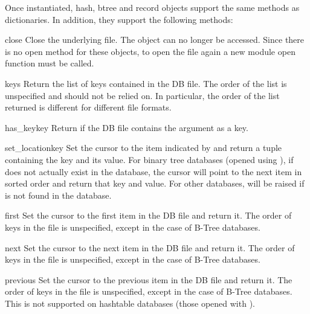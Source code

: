 Once instantiated, hash, btree and record objects support
the same methods as dictionaries.  In addition, they support
the following methods:

\begin{methoddesc}{close}{}
Close the underlying file.  The object can no longer be accessed.  Since
there is no open  method for these objects, to open the file
again a new  module open function must be called.
\end{methoddesc}

\begin{methoddesc}{keys}{}
Return the list of keys contained in the DB file.  The order of the list is
unspecified and should not be relied on.  In particular, the order of the
list returned is different for different file formats.
\end{methoddesc}

\begin{methoddesc}{has_key}{key}
Return  if the DB file contains the argument as a key.
\end{methoddesc}

\begin{methoddesc}{set_location}{key}
Set the cursor to the item indicated by  and return a tuple
containing the key and its value.  For binary tree databases (opened
using ), if  does not actually exist in
the database, the cursor will point to the next item in sorted order
and return that key and value.  For other databases,
 will be raised if  is not found in the
database.
\end{methoddesc}

\begin{methoddesc}{first}{}
Set the cursor to the first item in the DB file and return it.  The order of 
keys in the file is unspecified, except in the case of B-Tree databases.
\end{methoddesc}

\begin{methoddesc}{next}{}
Set the cursor to the next item in the DB file and return it.  The order of 
keys in the file is unspecified, except in the case of B-Tree databases.
\end{methoddesc}

\begin{methoddesc}{previous}{}
Set the cursor to the previous item in the DB file and return it.  The
order of keys in the file is unspecified, except in the case of B-Tree
databases.  This is not supported on hashtable databases (those opened
with ).
\end{methoddesc}

